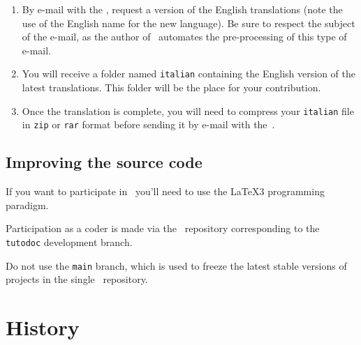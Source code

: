 \begin{enumerate}
      \item By e-mail with the , request a version of the English translations (note the use of the English name for the new language).
    Be sure to respect the subject of the e-mail, as the author of \thisproj\ automates the pre-processing of this type of e-mail.

      \item You will receive a folder named \verb#italian# containing the English version of the latest translations.
    This folder will be the place for your contribution.

      \item Once the translation is complete, you will need to compress your \verb#italian# file in \verb#zip# or \verb#rar# format before sending it by e-mail with the \,.
\end{enumerate}



\subsection{Improving the source code}

\begin{tdocimp}
    If you want to participate in \thisproj\, you'll need to use the \LaTeX3 programming paradigm.
\end{tdocimp}


Participation as a coder is made via the \thisrepo\ repository corresponding to the \verb#tutodoc# development branch.


\begin{tdoccaut}
Do not use the \verb#main# branch, which is used to freeze the latest stable versions of projects in the single \thismonorepo\ repository.
\end{tdoccaut}


\section{History}

\small

